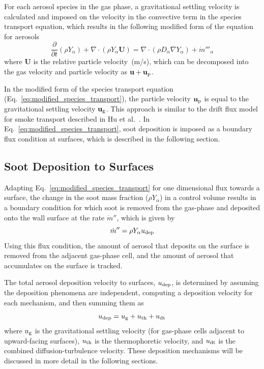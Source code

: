 For each aerosol species in the gas phase, a gravitational settling velocity is calculated and imposed on the velocity in the convective term in the species transport equation, which results in the following modified form of the equation for aerosols
\begin{equation}
\frac{\partial}{\partial t} (\rho Y_\alpha) + \nabla \cdot (\rho Y_\alpha \mathbf{U}) = \nabla \cdot (\rho D_\alpha \nabla Y_\alpha) + \dot m'''_\alpha
\label{eq:modified_species_transport}
\end{equation}
where $\mathbf{U}$ is the relative particle velocity~(m/s), which can be decomposed into the gas velocity and particle velocity as $\mathbf{u + u\sb{p}}$.

In the modified form of the species transport equation (Eq.~\ref{eq:modified_species_transport}), the particle velocity $\mathbf{u\sb{p}}$ is equal to the gravitational settling velocity $\mathbf{u\sb{g}}$. This approach is similar to the drift flux model for smoke transport described in Hu et al.~\cite{Hu:1}. In Eq.~\ref{eq:modified_species_transport}, soot deposition is imposed as a boundary flux condition at surfaces, which is described in the following section.

\subsection{Soot Deposition to Surfaces}

Adapting Eq.~\ref{eq:modified_species_transport} for one dimensional flux towards a surface, the change in the soot mass fraction ($\rho Y_{\alpha}$) in a control volume results in a boundary condition for which soot is removed from the gas-phase and deposited onto the wall surface at the rate $\dot m''$, which is given by
\begin{equation}
\dot m'' = \rho Y_\alpha u\sb{dep}
\label{eq:soot_deposition_bc}
\end{equation}
Using this flux condition, the amount of aerosol that deposits on the surface is removed from the adjacent gas-phase cell, and the amount of aerosol that accumulates on the surface is tracked.

The total aerosol deposition velocity to surfaces, $u\sb{dep}$, is determined by assuming the deposition phenomena are independent, computing a deposition velocity for each mechanism, and then summing
them as~\cite{Bixler:1}
\begin{equation}
u\sb{dep} = u\sb{g}+u\sb{th}+u\sb{dt}
\label{eq:total_soot_deposition}
\end{equation}
where $u\sb{g}$ is the gravitational settling velocity (for gas-phase cells adjacent to upward-facing surfaces), $u\sb{th}$ is the thermophoretic velocity, and $u\sb{dt}$ is the combined diffusion-turbulence velocity. These deposition mechanisms will be discussed in more detail in the following sections.

